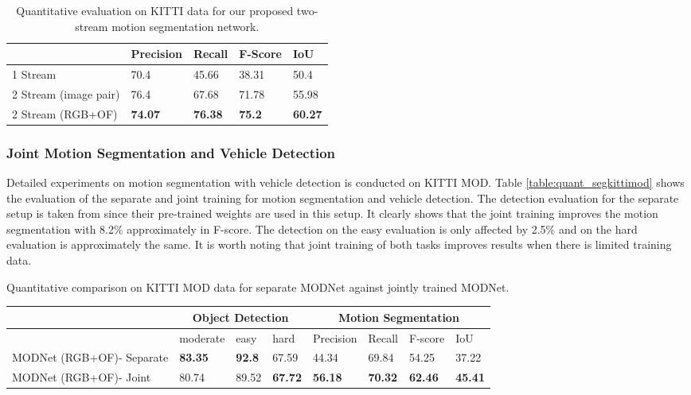 \documentclass[letterpaper, 10 pt, conference]{ieeeconf}  %
\begin{document}
\begin{table}[ht!]
\centering
\caption{Quantitative evaluation on KITTI data for our proposed two-stream motion segmentation network. }
\begin{tabular}{|l|l|l|l|l|}
\hline
 & Precision & Recall & F-Score & IoU \\ \hline
1 Stream & 70.4 & 45.66 & 38.31 & 50.4\\ \hline
2 Stream (image pair) & 76.4 & 67.68 & 71.78 & 55.98\\ \hline
2 Stream (RGB+OF) & \textbf{74.07} & \textbf{76.38} & \textbf{75.2} & \textbf{60.27} \\ \hline
\end{tabular}
\label{table:quant_seg}
\end{table}\subsubsection{Joint Motion Segmentation and Vehicle Detection} Detailed experiments on motion segmentation with vehicle detection is conducted on KITTI MOD. Table \ref{table:quant_segkittimod} shows the evaluation of the separate and joint training for motion segmentation and vehicle detection. The detection evaluation for the separate setup is taken from \cite{teichmann2016multinet} since their pre-trained weights are used in this setup. It clearly shows that the joint training improves the motion segmentation with 8.2\% approximately in F-score. The detection on the easy evaluation is only affected by 2.5\% and on the hard evaluation is approximately the same. It is worth noting that joint training of both tasks improves results when there is limited training data.
\centering
\caption{Quantitative comparison on KITTI MOD data for separate MODNet against jointly trained MODNet.}
\begin{tabular}{|l|l|l|l|l|l|l|l|}
\hline
 & \multicolumn{3}{|c|}{Object Detection} & \multicolumn{4}{|c|}{Motion Segmentation} \\\hline
  & moderate & easy & hard & Precision & Recall & F-score & IoU \\ \hline
MODNet (RGB+OF)- Separate & \textbf{83.35} & \textbf{92.8} & 67.59 & 44.34 & 69.84 & 54.25 & 37.22\\ \hline
MODNet (RGB+OF)- Joint & 80.74 &  89.52 & \textbf{67.72} & \textbf{56.18} & \textbf{70.32} & \textbf{62.46} & \textbf{45.41}\\ \hline
\end{tabular}
\label{table:quant_segkittimod}
\end{document}
